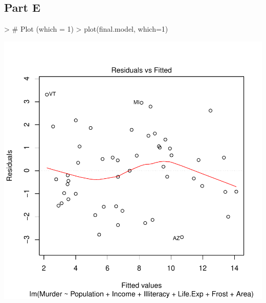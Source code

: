 \documentclass{article}
\begin{document}
\subsection{Part E}
\begin{Schunk}
\begin{Sinput}
> # Plot (which = 1)
> plot(final.model, which=1)
\end{Sinput}
\end{Schunk}
\includegraphics{Assignment2-015}
\end{document}
